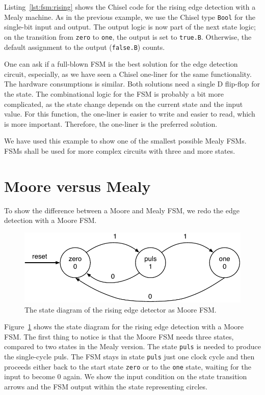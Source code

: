 \documentclass[%
    10pt,
    headinclude, footexclude,
    openright, %
    notitlepage,
    cleardoubleempty,
    headsepline,
    pointlessnumbers,
    bibtotoc, idxtotoc,
    ]{scrbook}
\newcommand{\code}[1]{{\small{\texttt{#1}}}}
\newcommand{\scale}{0.7}
\begin{document}
{Listing~\ref{lst:fsm:rising} shows the Chisel code for the rising edge detection
with a Mealy machine.
As in the previous example, we use the Chisel type \code{Bool} for the
single-bit input and output.
The output logic is now part of the next state logic; on the transition from
\code{zero} to \code{one}, the output is set to \code{true.B}. Otherwise,
the default assignment to the output (\code{false.B}) counts.

One can ask if a full-blown FSM is the best solution for the edge detection circuit,
especially, as we have seen a Chisel one-liner for the same functionality.
The hardware consumptions is similar. Both solutions need a single D flip-flop
for the state. The combinational logic for the FSM is probably a bit more complicated, as
the state change depends on the current state and the input value.
For this function, the one-liner is easier to write and easier to read,
which is more important. Therefore, the one-liner is the preferred solution.

We have used this example to show one of the smallest possible Mealy FSMs.
FSMs shall be used for more complex circuits with three and more states.

\section{Moore versus Mealy}

To show the difference between a Moore and Mealy FSM, we redo the edge
detection with a Moore FSM. 

\begin{figure}
  \centering
  \includegraphics[scale=\scale]{figures/state-diag-rising-moore}
  \caption{The state diagram of the rising edge detector as Moore FSM.}
  \label{fig:diag:rising:moore}
\end{figure}

Figure~\ref{fig:diag:rising:moore} shows the state diagram for the rising
edge detection with a Moore FSM. The first thing to notice is that the Moore FSM
needs three states, compared to two states in the Mealy version.
The state \code{puls} is needed to produce the single-cycle puls.
The FSM stays in state \code{puls} just one clock cycle and then
proceeds either back to the start state \code{zero} or to the \code{one}
state, waiting for the input to become 0 again.
We show the input condition on the state transition arrows and the
FSM output within the state representing circles.

}
\end{document}
